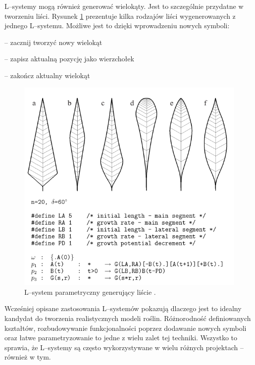 \documentclass[inz,longabstract]{iithesis}
\begin{document}
        L--systemy mogą również generować wielokąty. Jest to szczególnie przydatne w tworzeniu liści. Rysunek \ref{fig:lsystemLeafs} prezentuje kilka rodzajów liści wygenerowanych z jednego L--systemu. Możliwe jest to dzięki wprowadzeniu nowych symboli:
        \begin{description}[itemsep=2pt, parsep=2pt, topsep=2pt, partopsep=2pt]
            \item[\text{\{}] -- zacznij tworzyć nowy wielokąt 
            \item[.] -- zapisz aktualną pozycję jako wierzchołek
            \item[\text{\}}] -- zakończ aktualny wielokąt
        \end{description}
        \begin{figure}[H]
            \includegraphics[width=\linewidth]{lsystemLeafs.png}
            \caption{L--system parametryczny generujący liście \cite{plants}.} 
            \label{fig:lsystemLeafs}
        \end{figure}
        
        Wcześniej opisane zastosowania L--systemów pokazują dlaczego jest to idealny kandydat do tworzenia realistycznych modeli roślin. Różnorodność definiowanych kształtów, rozbudowywanie funkcjonalności poprzez dodawanie nowych symboli oraz łatwe parametryzowanie to jedne z wielu zalet tej techniki. Wszystko to sprawia, że L--systemy są często wykorzystywane w wielu różnych projektach -- również w tym. 
        
\end{document}
